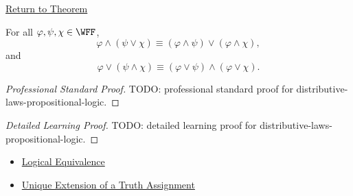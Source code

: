 \newpage
{}
\label{prf:distributive-laws-propositional-logic}

\begin{remark*}[Return]
\hyperref[thm:distributive-laws-propositional-logic]{Return to Theorem}
\end{remark*}

\begin{theorem*}
For all \(\varphi,\psi,\chi\in\WFF\),
\[
\varphi\land(\psi\lor\chi)
\equiv
(\varphi\land\psi)\lor(\varphi\land\chi),
\]
and
\[
\varphi\lor(\psi\land\chi)
\equiv
(\varphi\lor\psi)\land(\varphi\lor\chi).
\]
\end{theorem*}

\begin{proof}[Professional Standard Proof]
\LRAProofBodyStart
TODO: professional standard proof for distributive-laws-propositional-logic.
\end{proof}

\begin{proof}[Detailed Learning Proof]
\LRAProofBodyStart
TODO: detailed learning proof for distributive-laws-propositional-logic.
\end{proof}

\begin{remark*}
\end{remark*}

\begin{dependencies}
\begin{itemize}
  \item \hyperref[def:logical-equivalence-propositional-logic]{Logical Equivalence}
  \item \hyperref[thm:unique-extension-truth-assignment-propositional-logic]{Unique Extension of a Truth Assignment}
\end{itemize}
\end{dependencies}

\clearpage
